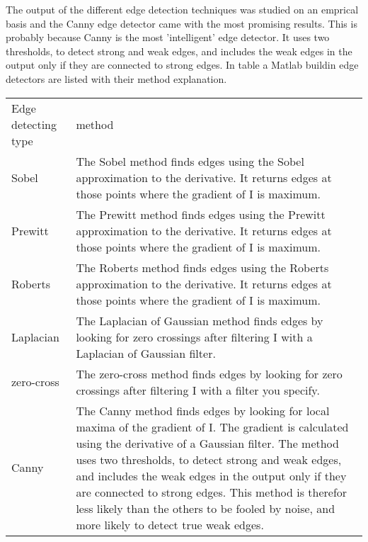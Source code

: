 
The output of the different edge detection techniques was studied on an emprical
basis and the Canny edge detector came with the most promising results. This is
probably because Canny is the most 'intelligent' edge detector.  It uses two
thresholds, to detect strong and weak edges, and includes the weak edges in the
output only if they are connected to strong edges. In table %
a Matlab buildin edge detectors are listed with their method explanation.

\begin{tabular}{|l|l|}
	\hline
	Edge detecting type		& method\\
	Sobel					& The Sobel method finds edges using the Sobel
	approximation to the derivative. It returns edges at those points where the
	gradient of I is maximum.\\
	\hline
	Prewitt					& The Prewitt method finds edges using the Prewitt
	approximation to the derivative. It returns edges at those points where the
	gradient of I is maximum.\\
	\hline
	Roberts					& The Roberts method finds edges using the Roberts
	approximation to the derivative. It returns edges at those points where the
	gradient of I is maximum.\\
	\hline
	Laplacian				& The Laplacian of Gaussian method finds edges by
	looking for zero crossings after filtering I with a Laplacian of Gaussian
	filter.\\
	\hline
	zero-cross				& The zero-cross method finds edges by looking for zero
	crossings after filtering I with a filter you specify.\\
	\hline
	Canny					& The Canny method finds edges by looking for local
	maxima of the gradient of I. The gradient is calculated using the derivative of
	a Gaussian filter. The method uses two thresholds, to detect strong and weak
	edges, and includes the weak edges in the output only if they are connected to
	strong edges. This method is therefor less likely than the others to be fooled
	by noise, and more likely to detect true weak edges.\\
	\hline
\end{tabular}

